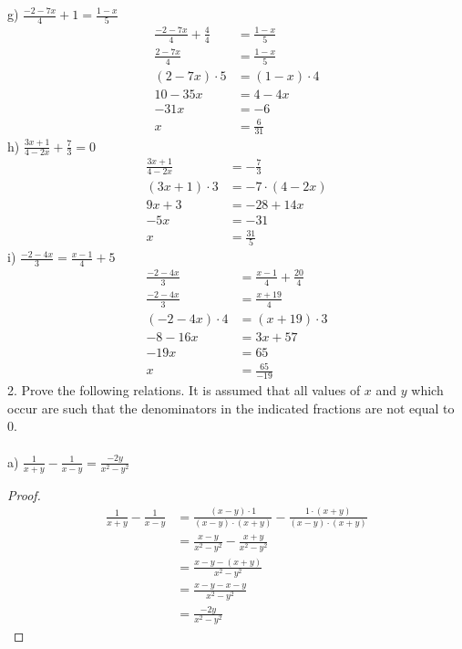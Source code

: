 \documentclass[12pt]{article}
\begin{document}
g) $\displaystyle \frac{-2-7x}{4}+1=\displaystyle \frac{1-x}{5}$
\begin{align*}
\displaystyle \frac{-2-7x}{4}+\displaystyle \frac{4}{4}&=\displaystyle \frac{1-x}{5} \\
\displaystyle \frac{2-7x}{4}&=\displaystyle \frac{1-x}{5} \\
(2-7x)\cdot5&=(1-x)\cdot4 \\
10-35x&=4-4x \\
-31x&=-6 \\
x&=\displaystyle \frac{6}{31}
\end{align*}
h) $\displaystyle \frac{3x+1}{4-2x}+\displaystyle \frac{7}{3}=0$
\begin{align*}
\displaystyle \frac{3x+1}{4-2x}&=-\displaystyle \frac{7}{3} \\
(3x+1)\cdot3&=-7\cdot(4-2x) \\
9x+3&=-28+14x \\
-5x&=-31 \\
x&=\displaystyle \frac{31}{5}
\end{align*}
i) $\displaystyle \frac{-2-4x}{3}=\displaystyle \frac{x-1}{4}+5$
\begin{align*}
\displaystyle \frac{-2-4x}{3}&=\displaystyle \frac{x-1}{4}+\displaystyle \frac{20}{4} \\
\displaystyle \frac{-2-4x}{3}&=\displaystyle \frac{x+19}{4} \\
(-2-4x)\cdot4&=(x+19)\cdot3 \\
-8-16x&=3x+57 \\
-19x&=65 \\
x&=\displaystyle \frac{65}{-19}
\end{align*}
2. Prove the following relations. It is assumed that all values of $x$ and $y$ which occur are such that the denominators in the indicated fractions are not equal to 0. \\
\\
a) $\displaystyle \frac{1}{x+y}-\displaystyle \frac{1}{x-y}=\displaystyle \frac{-2y}{x^2-y^2}$
\begin{proof}
\begin{align*}
\displaystyle \frac{1}{x+y}-\displaystyle \frac{1}{x-y}&=\displaystyle \frac{(x-y)\cdot1}{(x-y)\cdot(x+y)}-\displaystyle \frac{1\cdot(x+y)}{(x-y)\cdot(x+y)}\\
&=\displaystyle \frac{x-y}{x^2-y^2}-\displaystyle \frac{x+y}{x^2-y^2} \\
&=\displaystyle \frac{x-y-(x+y)}{x^2-y^2} \\
&=\displaystyle \frac{x-y-x-y}{x^2-y^2} \\
&=\displaystyle \frac{-2y}{x^2-y^2}
\end{align*}
\end{proof}
\end{document}
